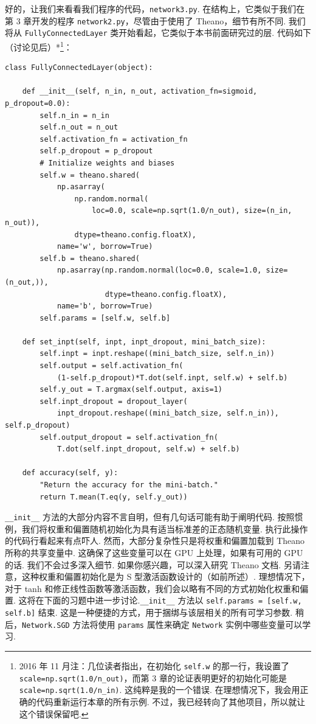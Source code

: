 好的，让我们来看看我们程序的代码，\texttt{network3.py}. 在结构上，它类似于我们在第 3 章开发的程序 \texttt{network2.py}，尽管由于使用了 Theano，细节有所不同. 我们将从 \texttt{FullyConnectedLayer} 类开始看起，它类似于本书前面研究过的层. 代码如下（讨论见后）*\footnote{2016 年 11 月注：几位读者指出，在初始化 \texttt{self.w} 的那一行，我设置了 \texttt{scale=np.sqrt(1.0/n\_\allowbreak{}out)}，而第 3 章的论证表明更好的初始化可能是 \texttt{scale=np.sqrt(1.0/n\_\allowbreak{}in)}. 这纯粹是我的一个错误. 在理想情况下，我会用正确的代码重新运行本章的所有示例. 不过，我已经转向了其他项目，所以就让这个错误保留吧.}：

\begin{lstlisting}
class FullyConnectedLayer(object):

    def __init__(self, n_in, n_out, activation_fn=sigmoid, p_dropout=0.0):
        self.n_in = n_in
        self.n_out = n_out
        self.activation_fn = activation_fn
        self.p_dropout = p_dropout
        # Initialize weights and biases
        self.w = theano.shared(
            np.asarray(
                np.random.normal(
                    loc=0.0, scale=np.sqrt(1.0/n_out), size=(n_in, n_out)),
                dtype=theano.config.floatX),
            name='w', borrow=True)
        self.b = theano.shared(
            np.asarray(np.random.normal(loc=0.0, scale=1.0, size=(n_out,)),
                       dtype=theano.config.floatX),
            name='b', borrow=True)
        self.params = [self.w, self.b]

    def set_inpt(self, inpt, inpt_dropout, mini_batch_size):
        self.inpt = inpt.reshape((mini_batch_size, self.n_in))
        self.output = self.activation_fn(
            (1-self.p_dropout)*T.dot(self.inpt, self.w) + self.b)
        self.y_out = T.argmax(self.output, axis=1)
        self.inpt_dropout = dropout_layer(
            inpt_dropout.reshape((mini_batch_size, self.n_in)), self.p_dropout)
        self.output_dropout = self.activation_fn(
            T.dot(self.inpt_dropout, self.w) + self.b)

    def accuracy(self, y):
        "Return the accuracy for the mini-batch."
        return T.mean(T.eq(y, self.y_out))

\end{lstlisting}

\texttt{\_\allowbreak{}\_\allowbreak{}init\_\allowbreak{}\_\allowbreak{}} 方法的大部分内容不言自明，但有几句话可能有助于阐明代码. 按照惯例，我们将权重和偏置随机初始化为具有适当标准差的正态随机变量. 执行此操作的代码行看起来有点吓人. 然而，大部分复杂性只是将权重和偏置加载到 Theano 所称的共享变量中. 这确保了这些变量可以在 GPU 上处理，如果有可用的 GPU 的话. 我们不会过多深入细节. 如果你感兴趣，可以深入研究 Theano 文档. 另请注意，这种权重和偏置初始化是为 S 型激活函数设计的（如前所述）. 理想情况下，对于 tanh 和修正线性函数等激活函数，我们会以略有不同的方式初始化权重和偏置. 这将在下面的习题中进一步讨论.\texttt{\_\allowbreak{}\_\allowbreak{}init\_\allowbreak{}\_\allowbreak{}} 方法以 \texttt{self.params = [self.w, self.b]} 结束. 这是一种便捷的方式，用于捆绑与该层相关的所有可学习参数. 稍后，\texttt{Network.SGD} 方法将使用 \texttt{params} 属性来确定 \texttt{Network} 实例中哪些变量可以学习.

